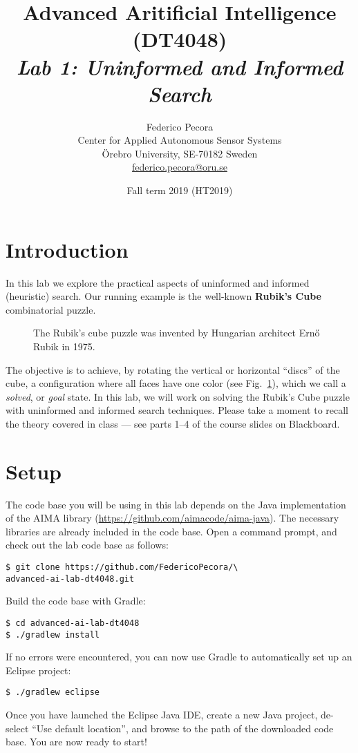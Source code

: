 \documentclass[a4paper]{article}
\title{Advanced Aritificial Intelligence (DT4048)\\{\em Lab 1: Uninformed and Informed Search}}
\author{Federico Pecora\\Center for Applied Autonomous Sensor Systems\\\"Orebro University, SE-70182 Sweden\\\url{federico.pecora@oru.se}}
\date{Fall term 2019 (HT2019)}
\begin{document}
\maketitle

\section{Introduction}

In this lab we explore the practical aspects of uninformed and informed (heuristic) search.  Our running example is the well-known {\bf Rubik's Cube} combinatorial puzzle.
\begin{figure}[!ht]
\centering

\caption{{\small The Rubik's cube puzzle was invented by Hungarian architect Ern\H{o} Rubik in 1975.}}
\label{fig:rc}
\end{figure}
The objective is to achieve, by rotating the vertical or horizontal ``discs'' of the cube, a configuration where all faces have one color (see Fig.~\ref{fig:rc}), which we call a {\em solved}, or {\em goal} state. In this lab, we will work on solving the Rubik's Cube puzzle with uninformed and informed search techniques. Please take a moment to recall the theory covered in class --- see parts 1--4 of the course slides on Blackboard.

\section{Setup}
The code base you will be using in this lab depends on the Java implementation of the AIMA library (\url{https://github.com/aimacode/aima-java}).  The necessary libraries are already included in the code base.
Open a command prompt, and check out the lab code base as follows:
\begin{lstlisting}
$ git clone https://github.com/FedericoPecora/\
advanced-ai-lab-dt4048.git
\end{lstlisting}
Build the code base with Gradle:
\begin{lstlisting}
$ cd advanced-ai-lab-dt4048
$ ./gradlew install
\end{lstlisting}
If no errors were encountered, you can now use Gradle to automatically set up an Eclipse project:
\begin{lstlisting}
$ ./gradlew eclipse
\end{lstlisting}
Once you have launched the Eclipse Java IDE, create a new Java project, de-select ``Use default location'', and browse to the path of the downloaded code base. You are now ready to start!
\end{document}
